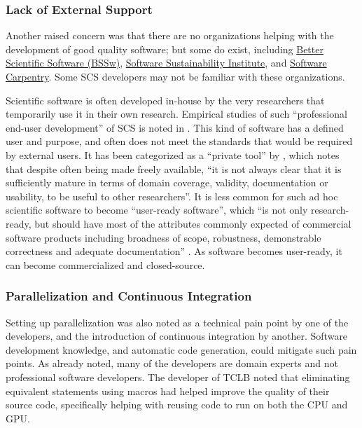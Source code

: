 \documentclass[final, 3p, times, authoryear]{elsarticle}
\begin{document}
\subsubsection{Lack of External Support}

Another raised concern was that there are no organizations helping with the
development of good quality software; but some do exist, including
\href{https://bssw.io/}{Better Scientific Software (BSSw)},
\href{https://www.software.ac.uk/}{Software Sustainability Institute}, and
\href{https://software-carpentry.org/}{Software Carpentry}. Some SCS developers
may not be familiar with these organizations. 

Scientific software is often developed in-house by the very researchers that
temporarily use it in their own research. Empirical studies of such
``professional end-user development'' of SCS is noted in \citep{segal2007end}.
This kind of software has a defined user and purpose, and often does not meet
the standards that would be required by external users. It has been categorized
as a ``private tool'' by \citep{gewaltig2012quality}, which notes that despite
often being made freely available, ``it is not always clear that it is
sufficiently mature in terms of domain coverage, validity, documentation or
usability, to be useful to other researchers''. It is less common for such ad
hoc scientific software to become ``user-ready software'', which ``is not only
research-ready, but should have most of the attributes commonly expected of
commercial software products including broadness of scope, robustness,
demonstrable correctness and adequate documentation''
\citep{gewaltig2012quality}. As software becomes user-ready, it can become
commercialized and closed-source. 

\subsubsection{Parallelization and Continuous Integration}

Setting up parallelization was also noted as a technical pain point by one of
the developers, and the introduction of continuous integration by another.
Software development knowledge, and automatic code generation, could mitigate
such pain points. As already noted, many of the developers are domain experts
and not professional software developers. The developer of TCLB noted that
eliminating equivalent statements using macros had helped improve the quality of
their source code, specifically helping with reusing code to run on both the CPU
and GPU. 
\end{document}
